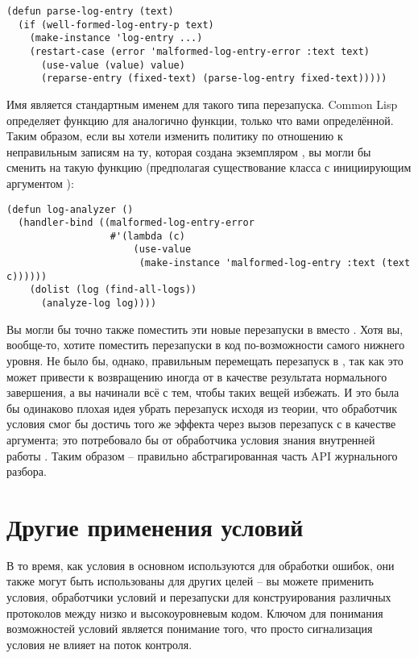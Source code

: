 \begin{lstlisting}
(defun parse-log-entry (text)
  (if (well-formed-log-entry-p text)
    (make-instance 'log-entry ...)
    (restart-case (error 'malformed-log-entry-error :text text)
      (use-value (value) value)
      (reparse-entry (fixed-text) (parse-log-entry fixed-text)))))
\end{lstlisting}

Имя  является стандартным именем для такого типа перезапуска. Common Lisp
определяет функцию для  аналогично  функции, только
что вами определённой. Таким образом, если вы хотели изменить политику по отношению к
неправильным записям на ту, которая создана экземпляром , вы
могли бы сменить  на такую функцию (предполагая существование
 класса с инициирующим аргументом ):

\begin{lstlisting}
(defun log-analyzer ()
  (handler-bind ((malformed-log-entry-error
                  #'(lambda (c)
                      (use-value
                       (make-instance 'malformed-log-entry :text (text c))))))
    (dolist (log (find-all-logs))
      (analyze-log log))))
\end{lstlisting}

Вы могли бы точно также поместить эти новые перезапуски в  вместо
. Хотя вы, вообще-то, хотите поместить перезапуски в код
по-возможности самого нижнего уровня. Не было бы, однако, правильным перемещать перезапуск
 в , так как это может привести к возвращению
иногда  от  в качестве результата нормального завершения,
а вы начинали всё с тем, чтобы таких вещей избежать. И это была бы одинаково плохая идея
убрать перезапуск  исходя из теории, что обработчик условия смог бы
достичь того же эффекта через вызов перезапуск  с  в качестве
аргумента; это потребовало бы от обработчика условия знания внутренней работы
. Таким образом  -- правильно абстрагированная
часть API журнального разбора.

\section{Другие применения условий}

В то время, как условия в основном используются для обработки ошибок, они также могут быть
использованы для других целей -- вы можете применить условия, обработчики условий и
перезапуски для конструирования различных протоколов между низко и высокоуровневым
кодом. Ключом для понимания возможностей условий является понимание того, что просто
сигнализация условия не влияет на поток контроля.

